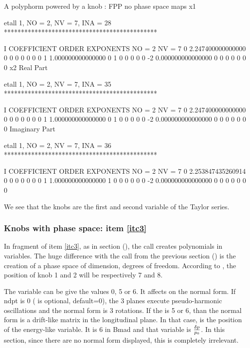 \documentclass{hitec}     %
\begin{document}
{\renewcommand{\codefont}{\footnotesize}
\begin{code}
 A polyphorm powered by a knob : FPP no phase space maps
  x1

 etall    1, NO =    2, NV =    7, INA =   28
 *********************************************

    I  COEFFICIENT          ORDER   EXPONENTS
      NO =     2      NV =     7
   0   2.247400000000000       0  0  0  0  0  0  0
   1   1.000000000000000       0  1  0  0  0  0  0
    -2   0.000000000000000       0  0  0  0  0  0  0
  x2
  Real Part

 etall    1, NO =    2, NV =    7, INA =   35
 *********************************************

    I  COEFFICIENT          ORDER   EXPONENTS
      NO =     2      NV =     7
   0   2.247400000000000       0  0  0  0  0  0  0
   1   1.000000000000000       0  1  0  0  0  0  0
    -2   0.000000000000000       0  0  0  0  0  0  0
  Imaginary Part

 etall    1, NO =    2, NV =    7, INA =   36
 *********************************************

    I  COEFFICIENT          ORDER   EXPONENTS
      NO =     2      NV =     7
   0   2.253847435260914       0  0  0  0  0  0  0
   1   1.000000000000000       1  0  0  0  0  0  0
    -2   0.000000000000000       0  0  0  0  0  0  0
\end{code}
\renewcommand{\codefont}{\small}

We see that the knobs are the first and second variable of the Taylor series.

\subsubsection{Knobs with phase space: item \ref{itc3}}
\label{s:initwithps}

In fragment of item \ref{itc3},  as in section (), the call  creates polynomials in  variables. The huge difference with the call from the previous section () is the creation of a phase space of   dimension,   degrees of freedom.  According to , the position of knob 1 and 2 will be respectively 7 and 8.

The variable  can be give the values 0, 5 or 6. It affects on the normal form. If ndpt is 0 ( is optional, default=0), the 3 planes execute pseudo-harmonic oscillations and the normal form is 3 rotations. If the  is 5 or 6, than the normal form is a drift-like matrix in the longitudinal plane. In that case,  is the position of the energy-like variable. It is 6 in Bmad and that variable is $\delta p \over p_0$. In this section, since there are no normal form displayed, this is completely irrelevant. 

}
\end{document}
